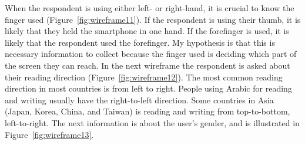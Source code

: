     When the respondent is using either left- or right-hand, it is crucial to know the finger used (Figure~\ref{fig:wireframe11}). If the respondent is using their thumb, it is likely that they held the smartphone in one hand. If the forefinger is used, it is likely that the respondent used the forefinger. My hypothesis is that this is necessary information to collect because the finger used is deciding which part of the screen they can reach. In the next wireframe the respondent is asked about their reading direction (Figure~\ref{fig:wireframe12}). The most common reading direction in most countries is from left to right. People using Arabic for reading and writing usually have the right-to-left direction. Some countries in Asia (Japan, Korea, China, and Taiwan) is reading and writing from top-to-bottom, left-to-right. 
    The next information is about the user's gender, and is illustrated in Figure~\ref{fig:wireframe13}.

